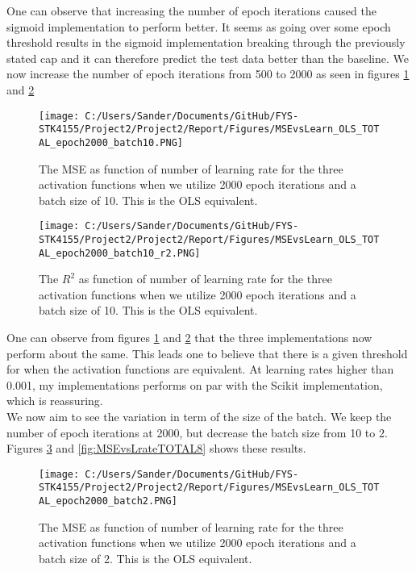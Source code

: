 \documentclass[12pt,a4paper]{article}
\begin{document}
\noindent One can observe that increasing the number of epoch iterations caused the sigmoid implementation to perform better. It seems as going over some epoch threshold results in the sigmoid implementation breaking through the previously stated cap and it can therefore predict the test data better than the baseline. We now increase the number of epoch iterations from 500 to 2000 as seen in figures \ref{fig:MSEvsLrateTOTAL5} and \ref{fig:MSEvsLrateTOTAL6}

\begin{figure}[H]
\centering
\texttt{[image: C:/Users/Sander/Documents/GitHub/FYS-STK4155/Project2/Project2/Report/Figures/MSEvsLearn\_OLS\_TOTAL\_epoch2000\_batch10.PNG]}
\caption{\label{fig:MSEvsLrateTOTAL5} The MSE as function of number of learning rate for the three activation functions when we utilize 2000 epoch iterations and a batch size of 10. This is the OLS equivalent.}
\end{figure}

\begin{figure}[H]
\centering
\texttt{[image: C:/Users/Sander/Documents/GitHub/FYS-STK4155/Project2/Project2/Report/Figures/MSEvsLearn\_OLS\_TOTAL\_epoch2000\_batch10\_r2.PNG]}
\caption{\label{fig:MSEvsLrateTOTAL6} The $R^2$ as function of number of learning rate for the three activation functions when we utilize 2000 epoch iterations and a batch size of 10. This is the OLS equivalent.}
\end{figure}

\noindent One can observe from figures \ref{fig:MSEvsLrateTOTAL5} and \ref{fig:MSEvsLrateTOTAL6} that the three implementations now perform about the same. This leads one to believe that there is a given threshold for when the activation functions are equivalent. At learning rates higher than 0.001, my implementations performs on par with the Scikit implementation, which is reassuring. 
\\
We now aim to see the variation in term of the size of the batch. We keep the number of epoch iterations at 2000, but decrease the batch size from 10 to 2. Figures \ref{fig:MSEvsLrateTOTAL7} and \ref{fig:MSEvsLrateTOTAL8} shows these results.

\begin{figure}[H]
\centering
\texttt{[image: C:/Users/Sander/Documents/GitHub/FYS-STK4155/Project2/Project2/Report/Figures/MSEvsLearn\_OLS\_TOTAL\_epoch2000\_batch2.PNG]}
\caption{\label{fig:MSEvsLrateTOTAL7} The MSE as function of number of learning rate for the three activation functions when we utilize 2000 epoch iterations and a batch size of 2. This is the OLS equivalent.}
\end{figure}
\end{document}
